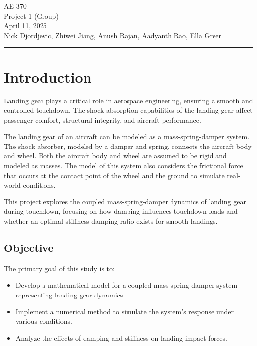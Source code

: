 \documentclass[12pt,letterpaper, onecolumn]{exam}
\begin{document}
\begingroup  
    \centering
    \LARGE AE 370\\
    \LARGE Project 1 (Group)\\[0.5em]
    \large April 11, 2025\\[0.5em]
    \large Nick Djordjevic, Zhiwei Jiang, Anush Rajan, Aadyanth Rao, Ella Greer\par
\endgroup
\rule{\textwidth}{0.4pt}
\pointsdroppedatright   %
\printanswers
\renewcommand{\solutiontitle}{\noindent\textbf{Ans:}\enspace}   %


\section{Introduction}

Landing gear plays a critical role in aerospace engineering, ensuring a smooth and controlled touchdown. The shock absorption capabilities of the landing gear affect passenger comfort, structural integrity, and aircraft performance. 

The landing gear of an aircraft can be modeled as a mass-spring-damper system. The shock absorber, modeled by a damper and spring, connects the aircraft body and wheel. Both the aircraft body and wheel are assumed to be rigid and modeled as masses. The model of this system also considers the frictional force that occurs at the contact point of the wheel and the ground to simulate real-world conditions. 

This project explores the coupled mass-spring-damper dynamics of landing gear during touchdown, focusing on how damping influences touchdown loads and whether an optimal stiffness-damping ratio exists for smooth landings.

\subsection{Objective}
The primary goal of this study is to:
\begin{itemize}
    \item Develop a mathematical model for a coupled mass-spring-damper system representing landing gear dynamics.
    \item Implement a numerical method to simulate the system’s response under various conditions.
    \item Analyze the effects of damping and stiffness on landing impact forces.
\end{itemize}
\end{document}
